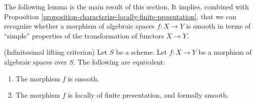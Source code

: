 \noindent
The following lemma is the main result of this section.
It implies, combined with
Proposition \ref{proposition-characterize-locally-finite-presentation},
that we can recognize whether a morphism of algebraic spaces
$f : X \to Y$ is smooth in terms of ``simple'' properties of the
transformation of functors $X \to Y$.

\begin{lemma}
\label{lemma-smooth-formally-smooth}
(Infinitesimal lifting criterion)
Let $S$ be a scheme.
Let $f : X \to Y$ be a morphism of algebraic spaces over $S$.
The following are equivalent:
\begin{enumerate}
\item The morphism $f$ is smooth.
\item The morphism $f$ is locally of finite presentation, and
formally smooth.
\end{enumerate}
\end{lemma}

